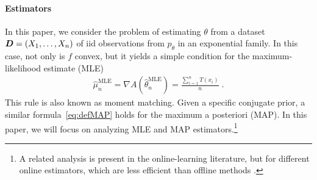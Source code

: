 \documentclass[twoside]{article}
\newcommand{\logpart}{A}
\newcommand{\nat}{\theta}
\begin{document}
\paragraph{Estimators}
In this paper, we consider the problem of estimating $\nat$ from a dataset ${\bm{D}} = (X_1, \dots, X_n)$ of iid observations from $p_\theta$ in an exponential family.
In this case, not only is $f$ convex, but it yields a simple condition for the maximum-likelihood estimate (MLE)
\begin{align}
 \hat \mu_n^\text{MLE} = \nabla  \logpart(\hat \nat_n^\text{MLE}) = \frac{\sum_{i=1}^n T(x_i)}{n} \; .
	\label{eq:defMLE}
\end{align}
This rule is also known as moment matching.
Given a specific conjugate prior, a similar formula~\eqref{eq:defMAP} holds for the maximum a posteriori (MAP). In this paper, we will focus on analyzing MLE and MAP estimators.\footnote{A related analysis is present in the online-learning literature, but for different online estimators, which are less efficient than offline methods \citep{azoury2001relative,dasgupta2007online}.}
\end{document}
